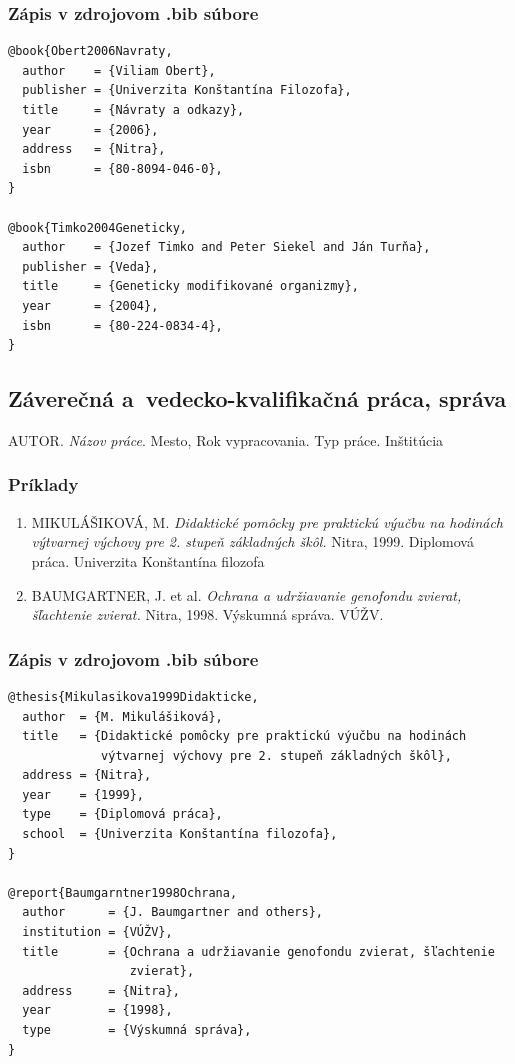 \subsubsection*{\normalsize Zápis v zdrojovom .bib súbore}
\begin{verbatim}
@book{Obert2006Navraty,
  author    = {Viliam Obert},
  publisher = {Univerzita Konštantína Filozofa},
  title     = {Návraty a odkazy},
  year      = {2006},
  address   = {Nitra},
  isbn      = {80-8094-046-0},
}

@book{Timko2004Geneticky,
  author    = {Jozef Timko and Peter Siekel and Ján Turňa},
  publisher = {Veda},
  title     = {Geneticky modifikované organizmy},
  year      = {2004},
  isbn      = {80-224-0834-4},
}
\end{verbatim}

\subsection{Záverečná a~vedecko-kvalifikačná práca, správa}
AUTOR. \textit{Názov práce}. Mesto, Rok vypracovania. Typ práce. Inštitúcia 

\subsubsection*{\normalsize Príklady}
\begin{enumerate}
  \item MIKULÁŠIKOVÁ, M. \textit{Didaktické pomôcky pre praktickú výučbu na hodinách výtvarnej výchovy pre 2. stupeň základných škôl.} Nitra, 1999. Diplomová práca. Univerzita Konštantína filozofa

  \item BAUMGARTNER, J. et al. \textit{Ochrana a udržiavanie genofondu zvierat, šľachtenie zvierat.} Nitra, 1998. Výskumná správa. VÚŽV.
\end{enumerate}

\subsubsection*{\normalsize Zápis v zdrojovom .bib súbore}
\begin{verbatim}
@thesis{Mikulasikova1999Didakticke,
  author  = {M. Mikulášiková},
  title   = {Didaktické pomôcky pre praktickú výučbu na hodinách
             výtvarnej výchovy pre 2. stupeň základných škôl},
  address = {Nitra},
  year    = {1999},
  type    = {Diplomová práca},
  school  = {Univerzita Konštantína filozofa},
}

@report{Baumgarntner1998Ochrana,
  author      = {J. Baumgartner and others},
  institution = {VÚŽV},
  title       = {Ochrana a udržiavanie genofondu zvierat, šľachtenie
                 zvierat},
  address     = {Nitra},
  year        = {1998},
  type        = {Výskumná správa},
}
\end{verbatim}

